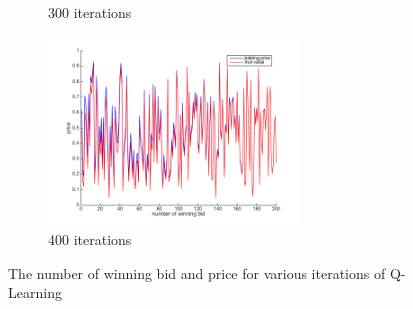 \begin{figure}[htbp]
\begin{subfigure}{0.5\textwidth}
\caption{300 iterations}
\label{fig:Q300}
\end{subfigure}
\begin{subfigure}{0.5\textwidth}
\includegraphics[width=0.9\linewidth, height=5cm]{Q400.png}
\caption{400 iterations}
\label{fig:Q400}
\end{subfigure}

\caption{The number of winning bid and price for various iterations of Q-Learning}
\label{fig:Q}
\end{figure}

